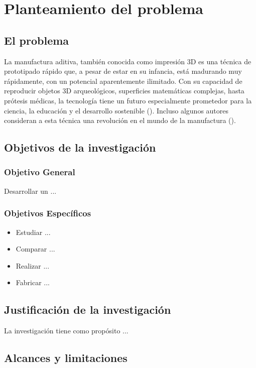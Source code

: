 \chapter{Planteamiento del problema}

\section{El problema}

La manufactura aditiva, también conocida como impresión 3D es una técnica de prototipado rápido que, a pesar de estar en su infancia, está madurando muy rápidamente, con un potencial aparentemente ilimitado. Con su capacidad de reproducir objetos 3D arqueológicos, superficies matemáticas complejas, hasta prótesis médicas, la tecnología tiene un futuro especialmente prometedor para la ciencia, la educación y el desarrollo sostenible (\cite{LowCost3DP}). Incluso algunos autores consideran a esta técnica una revolución en el mundo de la manufactura (\cite{AManufacturingRev}).

\newpage
\section{Objetivos de la investigación}

\subsection{Objetivo General}
Desarrollar un ...

\subsection{Objetivos Específicos}
\begin{itemize}
    \item Estudiar ...
    \item Comparar ...
	\item Realizar ...
	\item Fabricar ...
\end{itemize}

\newpage
\section{Justificación de la investigación}

La investigación tiene como propósito ...

\newpage
\section{Alcances y limitaciones}

